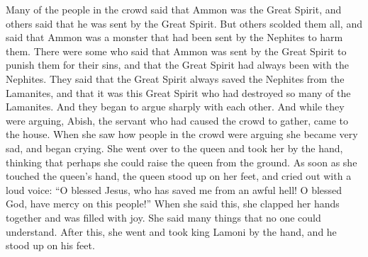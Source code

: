 Many of the people in the crowd said that Ammon was the Great Spirit, and others said that he was sent by the Great Spirit.
\bverse \iffalse But others rebuked them all, saying that he was a monster, who had been sent from the Nephites to torment them. \fi
But others scolded them all, and said that Ammon was a monster that had been sent by the Nephites to harm them.
\bverse \iffalse And there were some who said that Ammon was sent by the Great Spirit to afflict them because of their iniquities; and that it was the Great Spirit that had always attended the Nephites, who had ever delivered them out of their hands; and they said that it was this Great Spirit who had destroyed so many of their brethren, the Lamanites. \fi
There were some who said that Ammon was sent by the Great Spirit to punish them for their sins, and that the Great Spirit had always been with the Nephites. They said that the Great Spirit always saved the Nephites from the Lamanites, and that it was this Great Spirit who had destroyed so many of the Lamanites.
\bverse \iffalse And thus the contention began to be exceedingly sharp among them. And while they were thus contending, the woman servant who had caused the multitude to be gathered together came, and when she saw the contention which was among the multitude she was exceedingly sorrowful, even unto tears. \fi
And they began to argue sharply with each other. And while they were arguing, Abish, the servant who had caused the crowd to gather, came to the house. When she saw how people in the crowd were arguing she became very sad, and began crying.
\bverse \iffalse And it came to pass that she went and took the queen by the hand, that perhaps she might raise her from the ground; and as soon as she touched her hand she arose and stood upon her feet, and cried with a loud voice, saying: O blessed Jesus, who has saved me from an awful hell! O blessed God, have mercy on this people! \fi
She went over to the queen and took her by the hand, thinking that perhaps she could raise the queen from the ground. As soon as she touched the queen's hand, the queen stood up on her feet, and cried out with a loud voice: ``O blessed Jesus, who has saved me from an awful hell! O blessed God, have mercy on this people!''
\bverse \iffalse And when she had said this, she clasped her hands, being filled with joy, speaking many words which were not understood; and when she had done this, she took the king, Lamoni, by the hand, and behold he arose and stood upon his feet. \fi
When she said this, she clapped her hands together and was filled with joy. She said many things that no one could understand. After this, she went and took king Lamoni by the hand, and he stood up on his feet.
